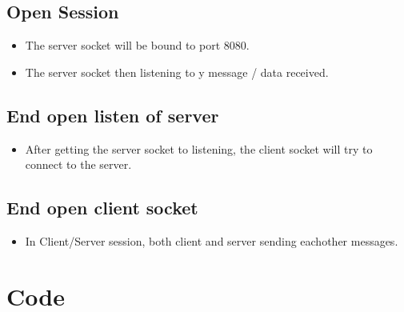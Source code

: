 \documentclass{article}
\begin{document}
    \subsection{Open Session}
    \begin{itemize}
        \item The server socket will be bound to port 8080.
        \item The server socket then listening to y message / data received.
    \end{itemize}

    \subsection{End open listen of server}
    \begin{itemize}
        \item After getting the server socket to listening, the client socket will try to connect to the server.
    \end{itemize}

    \subsection{End open client socket}
    \begin{itemize}
        \item In Client/Server session, both client and server sending eachother messages.
    \end{itemize}



\section{Code}
\end{document}

